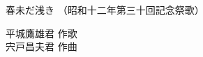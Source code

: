 \documentclass[10pt,b5j]{tarticle} %
\begin{document}
\begin{minipage}[c]{0.7\hsize} %
    \begin{center}
        {\LARGE
            春未だ浅き %
        }
        {\small 
            （昭和十二年第三十回記念祭歌） %
        }
    \end{center}
\end{minipage}
\begin{minipage}[c]{0.3\hsize} %
    \begin{flushright} %
        平城鷹雄君 作歌\\宍戸昌夫君 作曲 %
    \end{flushright}
\end{minipage}
\end{document}
